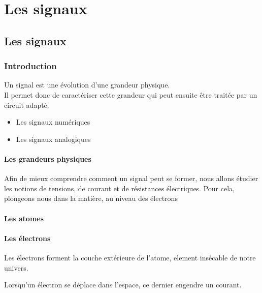 \part{Les signaux}
\chapter{Les signaux}

\section{Introduction}

Un signal est une évolution d'une grandeur physique.\\
Il permet donc de caractériser cette grandeur qui peut ensuite être traitée par un circuit adapté.


\begin{itemize}
    \item Les signaux numériques
    \item Les signaux analogiques
\end{itemize} 

\subsection{Les grandeurs physiques}

Afin de mieux comprendre comment un signal peut se former, nous allons étudier les notions de tensions, 
de courant et de résistances électriques.
Pour cela, plongeons nous dans la matière, au niveau des électrons

\subsection{Les atomes}


\subsection{Les électrons}

Les électrons forment la couche extérieure de l'atome, element insécable de notre univers.


Lorsqu'un électron se déplace dans l'espace, ce dernier engendre un courant.\\



